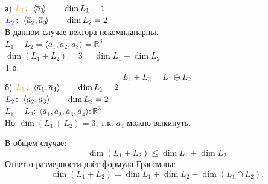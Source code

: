 \noindent а) ${\color{orange}L_1}\!:~ \langle \overline{a}_1\!\rangle  \qquad \dim L_1 = 1$\\
\phantom{а)}${\color{blue}L_2}\!:~ \langle \overline{a}_2, \overline{a}_3\!\rangle  \qquad \dim L_2 = 2$\\
В данном случае вектора некомпланарны.\\
$L_1+L_2=\langle \overline{a}_1, \overline{a}_2, \overline{a}_3\!\rangle  = \mathbb{R}^3$\\
$\dim (L_1 +L_2) = 3 = \dim L_1 + \dim L_2$\\
Т.о.
$$
L_1+L_2 = L_1 \oplus L_2
$$
б) ${\color{orange}L_1}\!:~ \langle \overline{a}_1, \overline{a}_4\rangle  \qquad \dim L_1 = 2$\\
${\color{blue}L_2}\!:~ \langle \overline{a}_2, \overline{a}_3\rangle  \qquad \dim L_2 = 2$\\
$L_1+L_2\!:~\langle \overline{a}_1, \overline{a}_2, \overline{a}_3, \overline{a}_4\!\rangle : \mathbb{R}^3$\\
Но $\dim (L_1+L_2)=3$, т.к. $\overline{a}_4$ можно выкинуть.

В общем случае:
$$
\dim (L_1+L_2) \leq \dim L_1 + \dim L_2
$$
Ответ о размерности даёт \textsf{формула Грассмана}:
$$
\dim (L_1+L_2)=\dim L_1+ \dim L_2 - \dim(L_1\cap L_2).
$$
